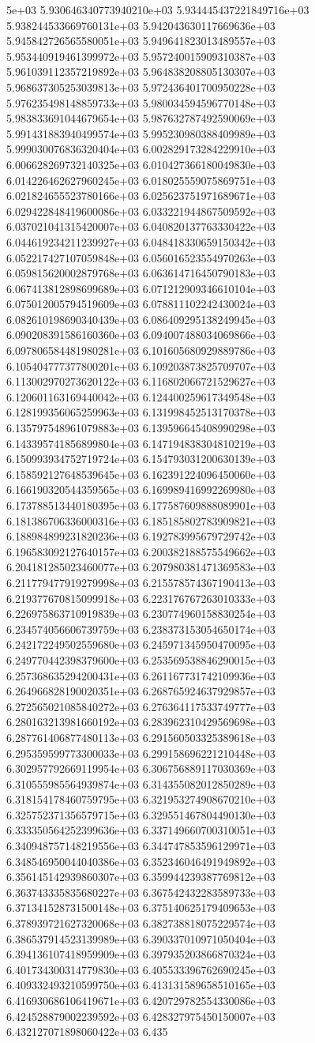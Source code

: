 5e+03	5.930646340773940210e+03	5.934445437221849716e+03	5.938244533669760131e+03	5.942043630117669636e+03	5.945842726565580051e+03	5.949641823013489557e+03	5.953440919461399972e+03	5.957240015909310387e+03	5.961039112357219892e+03	5.964838208805130307e+03	5.968637305253039813e+03	5.972436401700950228e+03	5.976235498148859733e+03	5.980034594596770148e+03	5.983833691044679654e+03	5.987632787492590069e+03	5.991431883940499574e+03	5.995230980388409989e+03	5.999030076836320404e+03	6.002829173284229910e+03	6.006628269732140325e+03	6.010427366180049830e+03	6.014226462627960245e+03	6.018025559075869751e+03	6.021824655523780166e+03	6.025623751971689671e+03	6.029422848419600086e+03	6.033221944867509592e+03	6.037021041315420007e+03	6.040820137763330422e+03	6.044619234211239927e+03	6.048418330659150342e+03	6.052217427107059848e+03	6.056016523554970263e+03	6.059815620002879768e+03	6.063614716450790183e+03	6.067413812898699689e+03	6.071212909346610104e+03	6.075012005794519609e+03	6.078811102242430024e+03	6.082610198690340439e+03	6.086409295138249945e+03	6.090208391586160360e+03	6.094007488034069866e+03	6.097806584481980281e+03	6.101605680929889786e+03	6.105404777377800201e+03	6.109203873825709707e+03	6.113002970273620122e+03	6.116802066721529627e+03	6.120601163169440042e+03	6.124400259617349548e+03	6.128199356065259963e+03	6.131998452513170378e+03	6.135797548961079883e+03	6.139596645408990298e+03	6.143395741856899804e+03	6.147194838304810219e+03	6.150993934752719724e+03	6.154793031200630139e+03	6.158592127648539645e+03	6.162391224096450060e+03	6.166190320544359565e+03	6.169989416992269980e+03	6.173788513440180395e+03	6.177587609888089901e+03	6.181386706336000316e+03	6.185185802783909821e+03	6.188984899231820236e+03	6.192783995679729742e+03	6.196583092127640157e+03	6.200382188575549662e+03	6.204181285023460077e+03	6.207980381471369583e+03	6.211779477919279998e+03	6.215578574367190413e+03	6.219377670815099918e+03	6.223176767263010333e+03	6.226975863710919839e+03	6.230774960158830254e+03	6.234574056606739759e+03	6.238373153054650174e+03	6.242172249502559680e+03	6.245971345950470095e+03	6.249770442398379600e+03	6.253569538846290015e+03	6.257368635294200431e+03	6.261167731742109936e+03	6.264966828190020351e+03	6.268765924637929857e+03	6.272565021085840272e+03	6.276364117533749777e+03	6.280163213981660192e+03	6.283962310429569698e+03	6.287761406877480113e+03	6.291560503325389618e+03	6.295359599773300033e+03	6.299158696221210448e+03	6.302957792669119954e+03	6.306756889117030369e+03	6.310555985564939874e+03	6.314355082012850289e+03	6.318154178460759795e+03	6.321953274908670210e+03	6.325752371356579715e+03	6.329551467804490130e+03	6.333350564252399636e+03	6.337149660700310051e+03	6.340948757148219556e+03	6.344747853596129971e+03	6.348546950044040386e+03	6.352346046491949892e+03	6.356145142939860307e+03	6.359944239387769812e+03	6.363743335835680227e+03	6.367542432283589733e+03	6.371341528731500148e+03	6.375140625179409653e+03	6.378939721627320068e+03	6.382738818075229574e+03	6.386537914523139989e+03	6.390337010971050404e+03	6.394136107418959909e+03	6.397935203866870324e+03	6.401734300314779830e+03	6.405533396762690245e+03	6.409332493210599750e+03	6.413131589658510165e+03	6.416930686106419671e+03	6.420729782554330086e+03	6.424528879002239592e+03	6.428327975450150007e+03	6.432127071898060422e+03	6.435